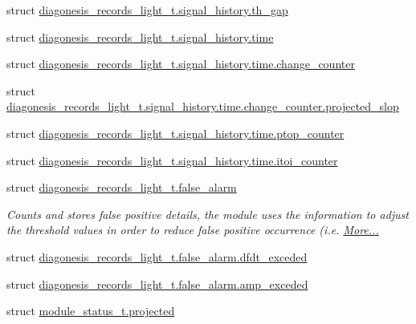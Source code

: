 \begin{DoxyCompactItemize}
\item 
struct \hyperlink{a00017_d3/d45/a00382}{diagonesis\+\_\+records\+\_\+light\+\_\+t.\+signal\+\_\+history.\+th\+\_\+gap}
\item 
struct \hyperlink{a00017_da/dee/a00383}{diagonesis\+\_\+records\+\_\+light\+\_\+t.\+signal\+\_\+history.\+time}
\item 
struct \hyperlink{a00017_d2/d56/a00384}{diagonesis\+\_\+records\+\_\+light\+\_\+t.\+signal\+\_\+history.\+time.\+change\+\_\+counter}
\item 
struct \hyperlink{a00017_d5/d05/a00385}{diagonesis\+\_\+records\+\_\+light\+\_\+t.\+signal\+\_\+history.\+time.\+change\+\_\+counter.\+projected\+\_\+slop}
\item 
struct \hyperlink{a00017_db/db9/a00387}{diagonesis\+\_\+records\+\_\+light\+\_\+t.\+signal\+\_\+history.\+time.\+ptop\+\_\+counter}
\item 
struct \hyperlink{a00017_dd/df5/a00386}{diagonesis\+\_\+records\+\_\+light\+\_\+t.\+signal\+\_\+history.\+time.\+itoi\+\_\+counter}
\item 
struct \hyperlink{a00017_d6/db8/a00376}{diagonesis\+\_\+records\+\_\+light\+\_\+t.\+false\+\_\+alarm}
\begin{DoxyCompactList}\small\item\em Counts and stores false positive details, the module uses the information to adjust the threshold values in order to reduce false positive occurrence (i.\+e.  \hyperlink{a00017_d6/db8/a00376}{More...}\end{DoxyCompactList}\item 
struct \hyperlink{a00017_d7/d08/a00378}{diagonesis\+\_\+records\+\_\+light\+\_\+t.\+false\+\_\+alarm.\+dfdt\+\_\+exceded}
\item 
struct \hyperlink{a00017_d4/d13/a00377}{diagonesis\+\_\+records\+\_\+light\+\_\+t.\+false\+\_\+alarm.\+amp\+\_\+exceded}
\item 
struct \hyperlink{a00017_d6/d75/a00604}{module\+\_\+status\+\_\+t.\+projected}
\end{DoxyCompactItemize}
